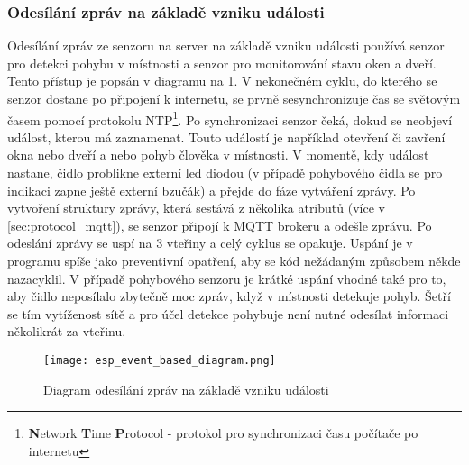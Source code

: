 \subsubsection*{Odesílání zpráv na základě vzniku události} \label{subsec:event_based_msg}
Odesílání zpráv ze senzoru na server na základě vzniku události používá senzor pro detekci pohybu v místnosti a senzor pro monitorování stavu oken a dveří. Tento přístup je popsán v diagramu na \cref{fig:esp_event_based_diagram}. V nekonečném cyklu, do kterého se senzor dostane po připojení k internetu, se prvně sesynchronizuje čas se světovým časem pomocí protokolu NTP\footnote{\textbf{N}etwork \textbf{T}ime \textbf{P}rotocol - protokol pro synchronizaci času počítače po internetu}. Po synchronizaci senzor čeká, dokud se neobjeví událost, kterou má zaznamenat. Touto událostí je například otevření či zavření okna nebo dveří a nebo pohyb člověka v místnosti. V momentě, kdy událost nastane, čidlo problikne externí led diodou (v případě pohybového čidla se pro indikaci zapne ještě externí bzučák) a přejde do fáze vytváření zprávy. Po vytvoření struktury zprávy, která sestává z několika atributů (více v \cref{sec:protocol_mqtt}), se senzor připojí k MQTT brokeru a odešle zprávu. Po odeslání zprávy se uspí na 3 vteřiny a celý cyklus se opakuje. Uspání je v programu spíše jako preventivní opatření, aby se kód nežádaným způsobem někde nazacyklil. V případě pohybového senzoru je krátké uspání vhodné také pro to, aby čidlo neposílalo zbytečně moc zpráv, když v místnosti detekuje pohyb. Šetří se tím vytíženost sítě a pro účel detekce pohybuje není nutné odesílat informaci několikrát za vteřinu.

\begin{figure}[H]
  \centering
  \texttt{[image: esp\_event\_based\_diagram.png]}
  \caption{Diagram odesílání zpráv na základě vzniku události}
  \label{fig:esp_event_based_diagram}
\end{figure} 
 
